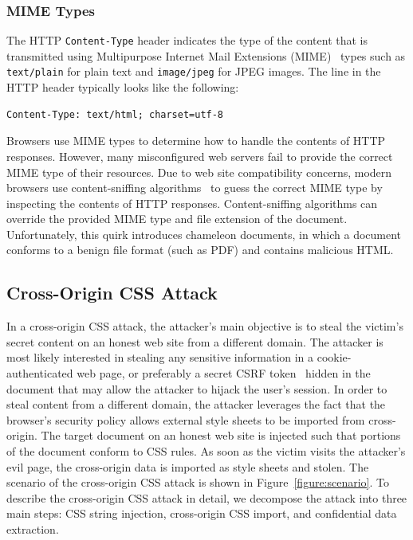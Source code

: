 \documentclass{acm_proc_article-sp}
\begin{document}
\subsubsection{MIME Types}
The HTTP \texttt{Content-Type} header indicates the type of the content that is transmitted using Multipurpose Internet Mail Extensions (MIME)~\cite{mime} types such as \texttt{text/plain} for plain text and \texttt{image/jpeg} for JPEG images. The line in the HTTP header typically looks like the following:
\begin{verbatim}
Content-Type: text/html; charset=utf-8
\end{verbatim}
Browsers use MIME types to determine how to handle the contents of HTTP responses. However, many misconfigured web servers fail to provide the correct MIME type of their resources. Due to web site compatibility concerns, modern browsers use content-sniffing algorithms~\cite{securecontentsniffing} to guess the correct MIME type by inspecting the contents of HTTP responses.  Content-sniffing algorithms can override the provided MIME type and file extension of the document. Unfortunately, this quirk introduces chameleon documents, in which a document conforms to a benign file format (such as PDF) and contains malicious HTML.

\subsection{Cross-Origin CSS Attack}
In a cross-origin CSS attack, the attacker's main objective is to steal the victim's secret content on an honest web site from a different domain. The attacker is most likely interested in stealing any sensitive information in a cookie-authenticated web page, or preferably a secret CSRF token~\cite{csrf} hidden in the document that may allow the attacker to hijack the user's session. In order to steal content from a different domain, the attacker leverages the fact that the browser's security policy allows external style sheets to be imported from cross-origin. The target document on an honest web site is injected such that portions of the document conform to CSS rules. As soon as the victim visits the attacker's evil page, the cross-origin data is imported as style sheets and stolen. The scenario of the cross-origin CSS attack is shown in Figure~\ref{figure:scenario}. To describe the cross-origin CSS attack in detail, we decompose the attack into three main steps: CSS string injection, cross-origin CSS import, and confidential data extraction.
\end{document}
